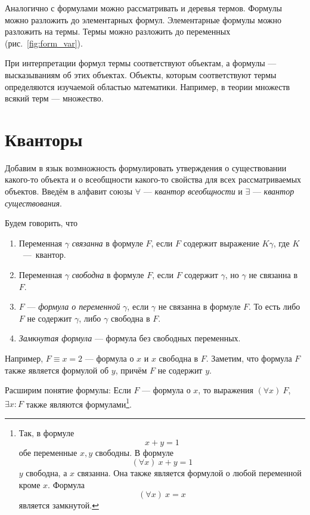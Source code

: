 Аналогично с формулами можно рассматривать и деревья термов.
Формулы можно разложить до элементарных формул. Элементарные формулы
можно разложить на термы. Термы можно разложить до переменных (рис.~\ref{fig:form_var}).

При интерпретации формул термы соответствуют объектам, а формулы --- высказываниям
об этих объектах. Объекты, которым соответствуют термы определяются изучаемой
областью математики. Например, в теории множеств всякий терм --- множество.

\section{Кванторы}

Добавим в язык возмножность формулировать утверждения о существовании
какого-то объекта и о всеобщности какого-то свойства для всех рассматриваемых объектов.
Введём в алфавит союзы $\forall$
--- {\it квантор всеобщности} и $\exists$
--- {\it квантор существования}.

\pagebreak
Будем говорить, что
\begin{enumerate}
  \item{}Переменная $\gamma$ {\it связанна}
  в формуле $F$, если $F$ содержит
  выражение $K\gamma$, где $K$~---~квантор.

  \item{}Переменная $\gamma$ {\it свободна}
  в формуле $F$, если $F$ содержит $\gamma$,
  но $\gamma$ не связанна в $F$.

  \item{}$F$ --- {\it формула о переменной} $\gamma$, если $\gamma$
  не связанна в формуле $F$.
  То есть либо $F$ не содержит $\gamma$, либо $\gamma$ свободна в $F$.

  \item{}{\it Замкнутая формула} --- формула без свободных переменных.
\end{enumerate}

Например, $F\equiv x=2$ --- формула о $x$ и $x$ свободна в $F$.
Заметим, что формула $F$ также является формулой об $y$, причём $F$ не содержит $y$.

Расширим понятие формулы:
Если $F$ --- формула о $x$, то выражения $(\forall x)~F$, $\exists x:F$
также являются формулами\footnote{Так, в формуле
  \[
    x+y=1
  \]
  обе переменные $x,y$ свободны. В формуле
  \[
    (\forall x)~x+y=1
  \]
  $y$ свободна, а $x$ связанна. Она также является формулой о любой
  переменной кроме $x$. Формула 
  \[
      (\forall x)~x=x
  \]
  является замкнутой.
}.

